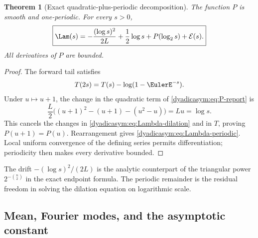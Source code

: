 \documentclass[11pt,oneside]{article}
\newtheorem{theorem}{Theorem}[section]
\theoremstyle{definition}
\theoremstyle{remark}
\begin{document}
\begin{theorem}[Exact quadratic-plus-periodic decomposition]
\label{dyadicasym:thm:periodic-decomposition}
The function $P$ is smooth and one-periodic.  For every $s>0$,
\begin{equation}
 \boxed{
 \Lam(s)=-\frac{(\log s)^2}{2L}+\frac12\log s
 +P(\log_2s)+\mathcal E(s).}                               \label{dyadicasym:eq:Lambda-periodic}
\end{equation}
All derivatives of $P$ are bounded.
\end{theorem}

\begin{proof}
The forward tail satisfies
\begin{equation*}
 T(2s)=T(s)-\log(1-\EulerE^{-s}).
\end{equation*}
Under $u\mapsto u+1$, the change in the quadratic term of \eqref{dyadicasym:eq:P-report} is
\begin{equation*}
 \frac L2\bigl((u+1)^2-(u+1)-(u^2-u)\bigr)=Lu=\log s.
\end{equation*}
This cancels the changes in \eqref{dyadicasym:eq:Lambda-dilation} and in $T$, proving
$P(u+1)=P(u)$.  Rearrangement gives \eqref{dyadicasym:eq:Lambda-periodic}.  Local uniform convergence of
the defining series permits differentiation; periodicity then makes every derivative bounded.
\end{proof}

The drift $-(\log s)^2/(2L)$ is the analytic counterpart of the triangular power
$2^{-\binom n2}$ in the exact endpoint formula.  The periodic remainder is the residual
freedom in solving the dilation equation on logarithmic scale.

\subsection{Mean, Fourier modes, and the asymptotic constant}
\end{document}
